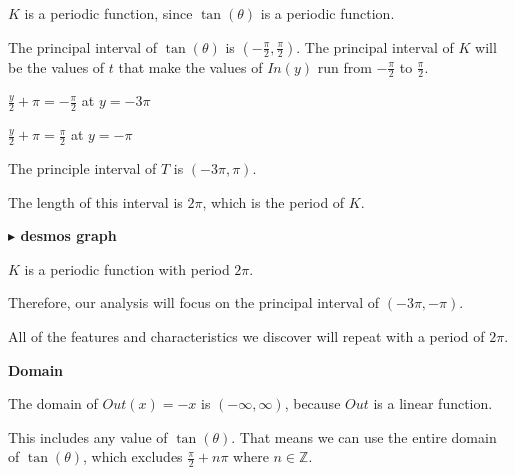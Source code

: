 \documentclass{ximera}
\begin{document}
{{\begin{template}
\end{template}

$K$ is a periodic function, since $\tan(\theta)$ is a periodic function. 

The principal interval of $\tan(\theta)$ is $\left( -\frac{\pi}{2}, \frac{\pi}{2}  \right)$.  The principal interval of $K$ will be the values of $t$ that make the values of $In(y)$ run from $-\frac{\pi}{2}$ to $\frac{\pi}{2}$. 


$\frac{y}{2} + \pi = -\frac{\pi}{2}$ at $y = -3\pi$

$\frac{y}{2} + \pi = \frac{\pi}{2}$ at $y = -\pi$

The principle interval of $T$ is $\left( -3\pi, \pi \right)$. 

The length of this interval is $2\pi$, which is the period of $K$. 












\textbf{\textcolor{blue!55!black}{$\blacktriangleright$ desmos graph}} 
\begin{center}
\end{center}











\begin{observation}

$K$ is a periodic function with period $2\pi$. 


Therefore, our analysis will focus on the principal interval of $\left( -3\pi, -\pi \right)$. 


All of the features and characteristics we discover will repeat with a period of $2\pi$.


\end{observation}









\textbf{\textcolor{blue!55!black}{Domain}}


The domain of $Out(x) = -x$ is $(-\infty, \infty)$, because $Out$ is a linear function.  

This includes any value of $\tan(\theta)$. That means we can use the entire domain of $\tan(\theta)$, which excludes $\frac{\pi}{2} + n \pi$ where $n \in \mathbb{Z}$. 


}}
\end{document}
